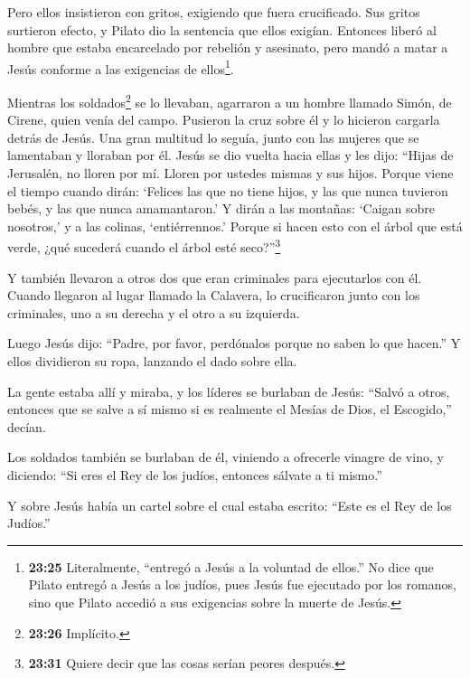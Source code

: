  Pero ellos insistieron con gritos, exigiendo que fuera
crucificado. Sus gritos surtieron efecto,  y Pilato dio la
sentencia que ellos exigían.  Entonces liberó al hombre que
estaba encarcelado por rebelión y asesinato, pero mandó a matar a Jesús
conforme a las exigencias de ellos\footnote{\textbf{23:25} Literalmente,
  ``entregó a Jesús a la voluntad de ellos.'' No dice que Pilato entregó
  a Jesús a los judíos, pues Jesús fue ejecutado por los romanos, sino
  que Pilato accedió a sus exigencias sobre la muerte de Jesús.}.

 Mientras los soldados\footnote{\textbf{23:26} Implícito.}
se lo llevaban, agarraron a un hombre llamado Simón, de Cirene, quien
venía del campo. Pusieron la cruz sobre él y lo hicieron cargarla detrás
de Jesús.  Una gran multitud lo seguía, junto con las
mujeres que se lamentaban y lloraban por él.  Jesús se dio
vuelta hacia ellas y les dijo: ``Hijas de Jerusalén, no lloren por mí.
Lloren por ustedes mismas y sus hijos.  Porque viene el
tiempo cuando dirán: `Felices las que no tiene hijos, y las que nunca
tuvieron bebés, y las que nunca amamantaron.'  Y dirán a
las montañas: `Caigan sobre nosotros,' y a las colinas, `entiérrennos.'
 Porque si hacen esto con el árbol que está verde, ¿qué
sucederá cuando el árbol esté seco?''\footnote{\textbf{23:31} Quiere
  decir que las cosas serían peores después.}

 Y también llevaron a otros dos que eran criminales para
ejecutarlos con él.  Cuando llegaron al lugar llamado la
Calavera, lo crucificaron junto con los criminales, uno a su derecha y
el otro a su izquierda.

 Luego Jesús dijo: ``Padre, por favor, perdónalos porque no
saben lo que hacen.'' Y ellos dividieron su ropa, lanzando el dado sobre
ella.

 La gente estaba allí y miraba, y los líderes se burlaban
de Jesús: ``Salvó a otros, entonces que se salve a sí mismo si es
realmente el Mesías de Dios, el Escogido,'' decían.

 Los soldados también se burlaban de él, viniendo a
ofrecerle vinagre de vino, y diciendo:  ``Si eres el Rey de
los judíos, entonces sálvate a ti mismo.''

 Y sobre Jesús había un cartel sobre el cual estaba
escrito: ``Este es el Rey de los Judíos.''

